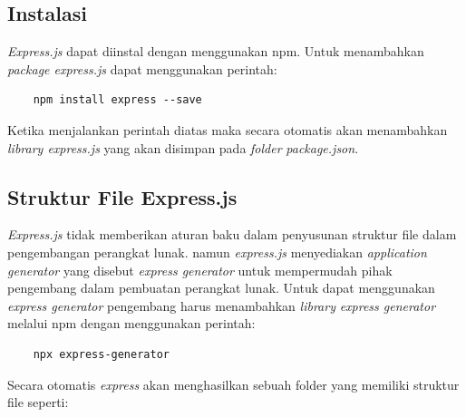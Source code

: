 \subsection{Instalasi}
\textit{Express.js} dapat diinstal dengan menggunakan npm. Untuk menambahkan \textit{package express.js} dapat menggunakan perintah:
\begin{verbatim}
    npm install express --save
\end{verbatim}
Ketika menjalankan perintah diatas maka secara otomatis akan menambahkan \textit{library express.js} yang akan disimpan pada \textit{folder} \textit{package.json}.

\subsection{Struktur File Express.js}
\textit{Express.js} tidak memberikan aturan baku dalam penyusunan struktur file dalam pengembangan perangkat lunak. namun \textit{express.js} menyediakan \textit{application generator} yang disebut \textit{express generator} untuk mempermudah pihak pengembang dalam pembuatan perangkat lunak\cite{expressjs:01:about}. Untuk dapat menggunakan \textit{express generator} pengembang harus menambahkan \textit{library} \textit{express generator} melalui npm dengan menggunakan perintah:

\begin{verbatim}
    npx express-generator
\end{verbatim}
Secara otomatis \textit{express} akan menghasilkan sebuah folder yang memiliki struktur file seperti:
        

